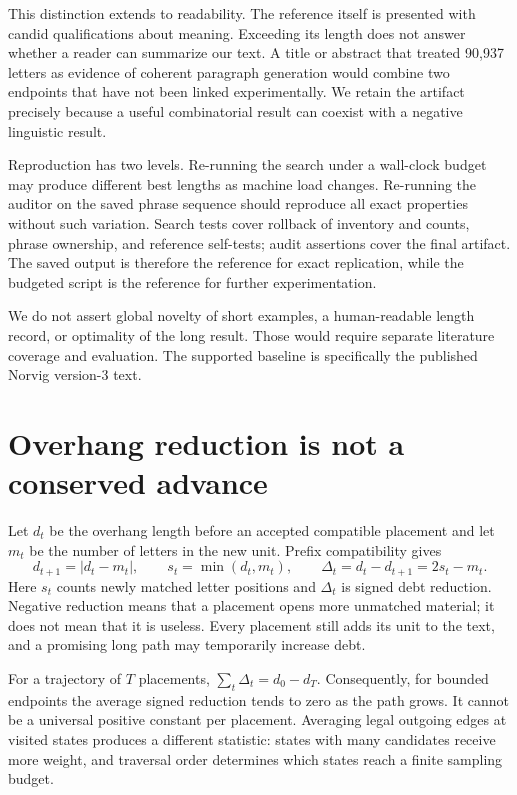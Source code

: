 \documentclass[11pt,letterpaper]{article}
\newcommand{\pageend}{\clearpage}
\begin{document}
This distinction extends to readability. The reference itself is presented with candid qualifications about meaning. Exceeding its length does not answer whether a reader can summarize our text. A title or abstract that treated 90,937 letters as evidence of coherent paragraph generation would combine two endpoints that have not been linked experimentally. We retain the artifact precisely because a useful combinatorial result can coexist with a negative linguistic result.

Reproduction has two levels. Re-running the search under a wall-clock budget may produce different best lengths as machine load changes. Re-running the auditor on the saved phrase sequence should reproduce all exact properties without such variation. Search tests cover rollback of inventory and counts, phrase ownership, and reference self-tests; audit assertions cover the final artifact. The saved output is therefore the reference for exact replication, while the budgeted script is the reference for further experimentation.

We do not assert global novelty of short examples, a human-readable length record, or optimality of the long result. Those would require separate literature coverage and evaluation. The supported baseline is specifically the published Norvig version-3 text.
\pageend

\section{Overhang reduction is not a conserved advance}
\label{sec:conservation}
Let $d_t$ be the overhang length before an accepted compatible placement and let $m_t$ be the number of letters in the new unit. Prefix compatibility gives
\[
 d_{t+1}=|d_t-m_t|,\qquad s_t=\min(d_t,m_t),\qquad
 \Delta_t=d_t-d_{t+1}=2s_t-m_t.
\]
Here $s_t$ counts newly matched letter positions and $\Delta_t$ is signed debt reduction. Negative reduction means that a placement opens more unmatched material; it does not mean that it is useless. Every placement still adds its unit to the text, and a promising long path may temporarily increase debt.

For a trajectory of $T$ placements, $\sum_t\Delta_t=d_0-d_T$. Consequently, for bounded endpoints the average signed reduction tends to zero as the path grows. It cannot be a universal positive constant per placement. Averaging legal outgoing edges at visited states produces a different statistic: states with many candidates receive more weight, and traversal order determines which states reach a finite sampling budget.
\end{document}
